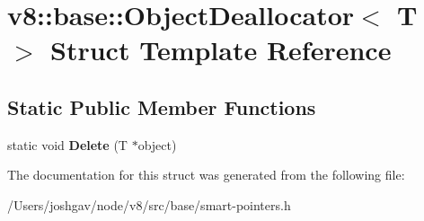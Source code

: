 \hypertarget{structv8_1_1base_1_1_object_deallocator}{}\section{v8\+:\+:base\+:\+:Object\+Deallocator$<$ T $>$ Struct Template Reference}
\label{structv8_1_1base_1_1_object_deallocator}
\subsection*{Static Public Member Functions}
\begin{DoxyCompactItemize}
\item 
static void {\bfseries Delete} (T $\ast$object)\hypertarget{structv8_1_1base_1_1_object_deallocator_a3ace386d8e3a74c9ba3991ecb24a1755}{}\label{structv8_1_1base_1_1_object_deallocator_a3ace386d8e3a74c9ba3991ecb24a1755}

\end{DoxyCompactItemize}


The documentation for this struct was generated from the following file\+:\begin{DoxyCompactItemize}
\item 
/\+Users/joshgav/node/v8/src/base/smart-\/pointers.\+h\end{DoxyCompactItemize}
